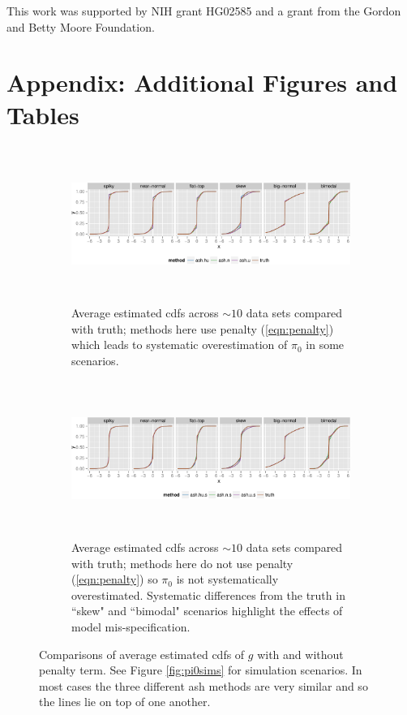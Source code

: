 \documentclass[11pt]{article}
\begin{document}
This work was supported by NIH grant HG02585 and a grant from the Gordon and Betty Moore Foundation.





\clearpage
\appendix

\section{Appendix: Additional Figures and Tables}

\begin{figure}[h!] 
\begin{subfigure}{\textwidth}
\includegraphics[height=2in]{../analysis/figure/plot_cdf_eg.Rmd/mean_cdf-1.pdf}
\caption{Average estimated cdfs across $\sim10$ data sets compared with truth; methods here use penalty (\ref{eqn:penalty}) which leads to systematic overestimation of $\pi_0$ in some scenarios.}
\end{subfigure}
\begin{subfigure}{\textwidth}
\includegraphics[height=2in]{../analysis/figure/plot_cdf_eg.Rmd/mean_cdf_nopen-1.pdf}
\caption{Average estimated cdfs across $\sim10$ data sets compared with truth; methods here do not use penalty (\ref{eqn:penalty}) so $\pi_0$ is not systematically overestimated. Systematic differences from the truth in ``skew" and ``bimodal" scenarios highlight the effects of model mis-specification.}
\end{subfigure}
\caption{Comparisons of average estimated cdfs of $g$ with and without penalty term. See Figure \ref{fig:pi0sims} for simulation scenarios. In most cases the three different ash methods are very similar and so the lines lie on top of one another.} \label{fig:pen-nopen}
\end{figure}
\end{document}
